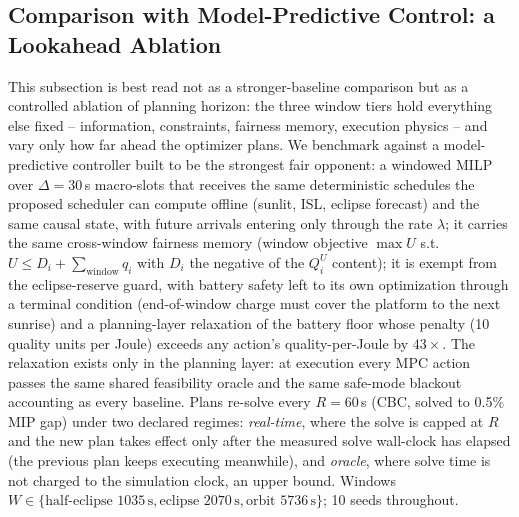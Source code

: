 
\subsection{Comparison with Model-Predictive Control: a Lookahead Ablation}\label{EV_MPC}
This subsection is best read not as a stronger-baseline comparison but as a
controlled ablation of planning horizon: the three window tiers hold
everything else fixed -- information, constraints, fairness memory, execution
physics -- and vary only how far ahead the optimizer plans. We benchmark
against a model-predictive controller built to be the strongest
fair opponent: a windowed MILP over $\Delta{=}30$\,s macro-slots that receives
the same deterministic schedules the proposed scheduler can compute offline
(sunlit, ISL, eclipse forecast) and the same causal state, with future
arrivals entering only through the rate $\lambda$; it carries the same
cross-window fairness memory (window objective $\max U$ s.t.\ $U \le D_i +
\sum_{\text{window}} q_i$ with $D_i$ the negative of the $Q^U_i$ content); it
is exempt from the eclipse-reserve guard, with battery safety left to its own
optimization through a terminal condition (end-of-window charge must cover the
platform to the next sunrise) and a planning-layer relaxation of the battery
floor whose penalty (10 quality units per Joule) exceeds any action's
quality-per-Joule by $43\times$. The relaxation exists only in the planning
layer: at execution every MPC action passes the same shared feasibility
oracle and the same safe-mode blackout accounting as every baseline. Plans
re-solve every $R{=}60$\,s (CBC, solved to 0.5\% MIP gap) under two declared
regimes: \emph{real-time}, where the solve is capped at $R$ and the new plan
takes effect only after the measured solve wall-clock has elapsed (the
previous plan keeps executing meanwhile), and \emph{oracle}, where solve
time is not charged to the simulation clock, an upper bound. Windows $W \in
\{\text{half-eclipse } 1035\,\mathrm{s}, \text{eclipse } 2070\,\mathrm{s},
\text{orbit } 5736\,\mathrm{s}\}$; 10 seeds throughout.

